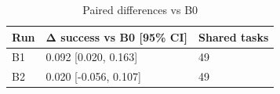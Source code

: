 \begin{table}[t]
\centering
\caption{Paired differences vs B0}
\begin{tabular}{lll}
\hline
Run & Δ success vs B0 [95\% CI] & Shared tasks \\
\hline
B1 & 0.092 [0.020, 0.163] & 49 \\
B2 & 0.020 [-0.056, 0.107] & 49 \\
\hline
\end{tabular}
\end{table}
